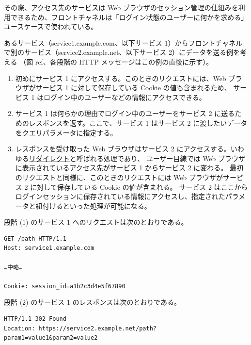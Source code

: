 \documentclass[uplatex]{jsarticle}
\def\ref#1{ref}%
\def\label#1{}%
\begin{document}
その際、アクセス先のサービスは Web ブラウザのセッション管理の仕組みを利用できるため、フロントチャネルは「ログイン状態のユーザーに何かを求める」ユースケースで使われている。

\begin{exa}[フロントチャネルによるサービス間のデータ送信]\label{exa:ch6-front-channel}
あるサービス（service1.example.com、以下サービス 1）からフロントチャネルで別のサービス（service2.example.net、以下サービス 2）にデータを送る例を考える
（図 \ref{fig:ch6-front-channel}、各段階の HTTP メッセージはこの例の直後に示す）。
\begin{enumerate}
\item 初めにサービス 1 にアクセスする。このときのリクエストには、Web ブラウザがサービス 1 に対して保存している Cookie の値も含まれるため、
サービス 1 はログイン中のユーザーなどの情報にアクセスできる。
\item サービス 1 は何らかの理由でログイン中のユーザーをサービス 2 に送るためのレスポンスを返す。ここで、サービス 1 はサービス 2 に渡したいデータをクエリパラメータに指定する。
\item レスポンスを受け取った Web ブラウザはサービス 2 にアクセスする。いわゆる\underline{リダイレクト}と呼ばれる処理であり、
ユーザー目線では Web ブラウザに表示されているアクセス先がサービス 1 からサービス 2 に変わる。
最初のリクエストと同様に、このときのリクエストには Web ブラウザがサービス 2 に対して保存している Cookie の値が含まれる。
サービス 2 はここからログインセッションに保存されている情報にアクセスし、指定されたパラメータと紐付けるといった処理が可能になる。
\end{enumerate}
\end{exa}

段階 (1) のサービス 1 へのリクエストは次のとおりである。

\begin{verbatim}
GET /path HTTP/1.1
Host: service1.example.com

…中略…

Cookie: session_id=a1b2c3d4e5f67890
\end{verbatim}

段階 (2) のサービス 1 のレスポンスは次のとおりである。

\begin{verbatim}
HTTP/1.1 302 Found
Location: https://service2.example.net/path?param1=value1&param2=value2
\end{verbatim}
\end{document}

